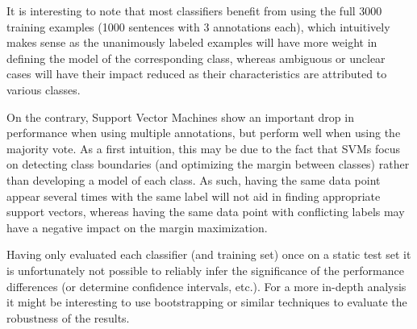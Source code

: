 \documentclass[11pt, a4paper,onecolumn]{article}
\begin{document}
It is interesting to note that most classifiers benefit from using the full 3000 training examples (1000 sentences with 3 annotations each), which intuitively makes sense as the unanimously labeled examples will have more weight in defining the model of the corresponding class, whereas ambiguous or unclear cases will have their impact reduced as their characteristics are attributed to various classes.

On the contrary, Support Vector Machines show an important drop in performance when using multiple annotations, but perform well when using the majority vote.  As a first intuition, this may be due to the fact that SVMs focus on detecting class boundaries (and optimizing the margin between classes) rather than developing a model of each class.  As such, having the same data point appear several times with the same label will not aid in finding appropriate support vectors, whereas having the same data point with conflicting labels may have a negative impact on the margin maximization.

Having only evaluated each classifier (and training set) once on a static test set it is unfortunately not possible to reliably infer the significance of the performance differences (or determine confidence intervals, etc.).  For a more in-depth analysis it might be interesting to use bootstrapping or similar techniques to evaluate the robustness of the results.
\end{document}
